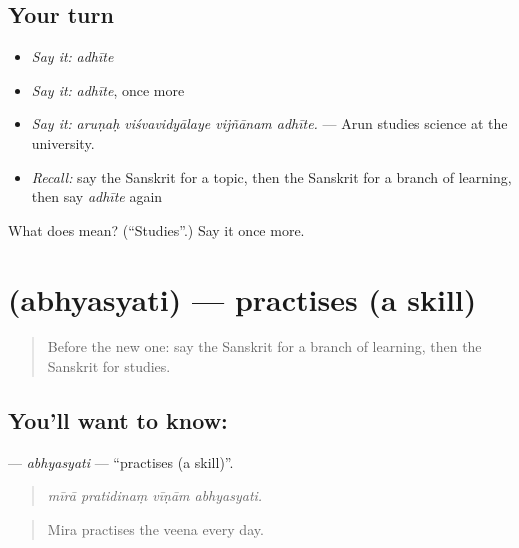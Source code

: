 \subsection*{Your turn}
\begin{itemize}
\raggedright
  \item \emph{Say it:} \emph{adhīte}
  \item \emph{Say it:} \emph{adhīte}, once more
  \item \emph{Say it:} \emph{aruṇaḥ viśvavidyālaye vijñānam adhīte.} — Arun studies science at the university.
  \item \emph{Recall:} say the Sanskrit for a topic, then the Sanskrit for a branch of learning, then say \emph{adhīte} again
\end{itemize}

\begin{tcolorbox}[breakable,colback=teal!4,colframe=teal!35!black,title={Before you move on}]
What does  mean? (\textquotedblleft{}Studies\textquotedblright{}.) Say it once more.
\end{tcolorbox}
\section[\texorpdfstring{\sk{अभ्यस्यति} (abhyasyati)}{अभ्यस्यति (abhyasyati)}]{ (abhyasyati) — practises (a skill)}

\label{lesson:SA-C363-abhyasyati}



\begin{quote}
Before the new one: say the Sanskrit for a branch of learning, then the Sanskrit for studies.
\end{quote}

\subsection*{You'll want to know: }
\textbf{} — \emph{abhyasyati} — \textquotedblleft{}practises (a skill)\textquotedblright{}.

\begin{quote}
   
\end{quote}

\begin{quote}
\emph{mīrā pratidinaṃ vīṇām abhyasyati.}
\end{quote}

\begin{quote}
Mira practises the veena every day.
\end{quote}

